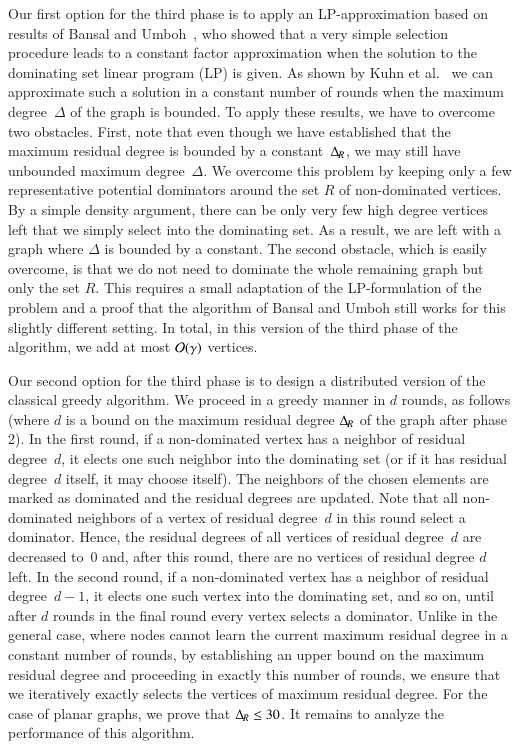 Our first option for the third phase is to apply an LP-approximation based on
results of Bansal and Umboh~\cite{bansal2017tight}, who showed
that a very simple selection procedure leads to a constant factor
approximation when the solution to the dominating set linear
program (LP) is given. As shown by Kuhn et al.~\cite{kuhn2006price} we can approximate such a solution in a
constant number of rounds when the maximum degree~$\Delta$
of the graph is bounded.
To apply these results, we have to overcome two obstacles. First,
note that even though we have established that the maximum residual
degree is bounded by a constant~$\Delta_{\hspace{-1pt}R}$, we may still have unbounded maximum
degree~$\Delta$. We overcome this problem by keeping only a few
representative potential dominators around the set $R$ of non-dominated
vertices. By a simple
density argument, there can be only very few high degree vertices left
that we simply select into the dominating set. As a result, we are left with
a graph where $\Delta$ is bounded by a constant. The second obstacle,
which is easily overcome, is that we do not need to dominate the
whole remaining graph but only the set $R$. This requires a small
adaptation of the LP-formulation of the problem and a proof that the
algorithm of Bansal and Umboh still works for this slightly different setting.
In total, in this version of the third phase of the algorithm, we add at most $\mathcal{O}(\gamma)$
vertices.


Our second option for the third phase is to design a  distributed version of the
classical greedy algorithm.
We proceed in a greedy manner in $d$ rounds, as follows (where
$d$ is a bound on the maximum residual degree $\Delta_{\hspace{-1pt}R}$ of the graph after phase 2).
In the first round, if a non-dominated
vertex has a neighbor of residual degree~$d$, it elects one such neighbor into
the dominating set (or if it has residual degree~$d$ itself, it may choose itself).
The neighbors of the chosen elements are
marked as dominated and the residual degrees are updated. Note that
all non-dominated neighbors of a vertex of residual degree~$d$
in this round select a dominator. Hence, the residual degrees
of all vertices of residual degree~$d$ are decreased to~$0$ and, after
this round, there are no vertices of residual degree $d$ left.
In the second round, if a non-dominated vertex has a neighbor
of residual degree~$d-1$, it elects
one such vertex into the dominating set, and so on, until after $d$ rounds
in the final round every vertex selects a dominator. Unlike in the general
case, where
nodes cannot learn the current maximum residual degree in a constant
number of rounds, by establishing
an upper bound on the maximum residual degree and proceeding in exactly
this number of rounds, we ensure that we iteratively exactly selects the
vertices of maximum residual degree. For the case of planar graphs,
we prove that $\Delta_{\hspace{-1pt}R}\leq 30$. It remains to analyze the performance
of this algorithm.


